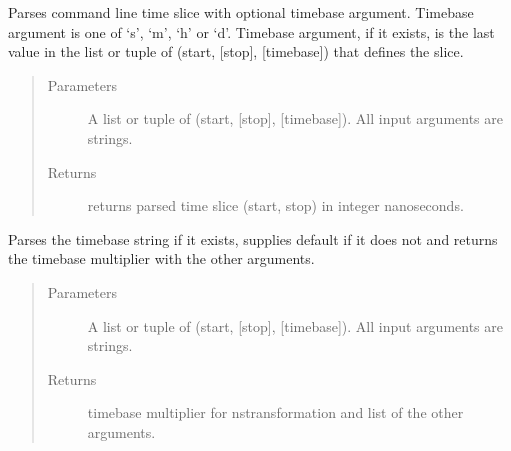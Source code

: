 \documentclass[letterpaper,10pt,english]{sphinxmanual}
\begin{document}
\begin{fulllineitems}
\label{\detokenize{autodocs/misc:listmode.misc.parse_time}}
\sphinxAtStartPar
Parses command line time slice with optional timebase argument. Timebase argument is one of ‘s’, ‘m’, ‘h’ or ‘d’.
Timebase argument, if it exists, is the last value in the list or tuple of (start, {[}stop{]}, {[}timebase{]}) that defines
the slice.
\begin{quote}\begin{description}
\item[{Parameters}] \leavevmode
\sphinxAtStartPar
{} \textendash{} A list or tuple of (start, {[}stop{]}, {[}timebase{]}). All input arguments are strings.

\item[{Returns}] \leavevmode
\sphinxAtStartPar
returns parsed time slice (start, stop) in integer nanoseconds.

\end{description}\end{quote}

\end{fulllineitems}


\begin{fulllineitems}
\label{\detokenize{autodocs/misc:listmode.misc.parse_timebase}}
\sphinxAtStartPar
Parses the timebase string if it exists, supplies default if it does not and returns the timebase multiplier
with the other arguments.
\begin{quote}\begin{description}
\item[{Parameters}] \leavevmode
\sphinxAtStartPar
{} \textendash{} A list or tuple of (start, {[}stop{]}, {[}timebase{]}). All input arguments are strings.

\item[{Returns}] \leavevmode
\sphinxAtStartPar
timebase multiplier for ns\sphinxhyphen{}transformation and list of the other arguments.

\end{description}\end{quote}

\end{fulllineitems}
\end{document}
